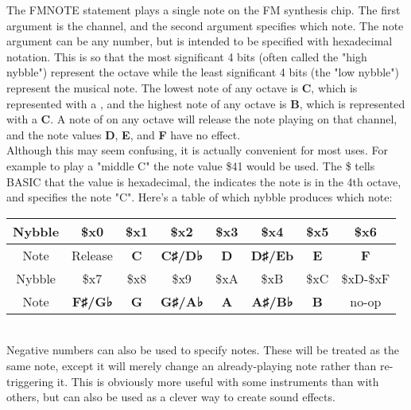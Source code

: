 The {\ttfamily FMNOTE} statement plays a single note on the FM synthesis chip.
The first argument is the channel, and the second argument specifies which
note.  The note argument can be any number, but is intended to be specified
with hexadecimal notation.  This is so that the most significant 4 bits (often
called the "high nybble") represent the octave while the least significant 4
bits (the "low nybble") represent the musical note.  The lowest note of any
octave is {\ttfamily\bfseries C}, which is represented with a {},
and the highest note of any octave is {\ttfamily\bfseries B}, which is
represented with a {\ttfamily\bfseries C}.  A note of {} on any
octave will release the note playing on that channel, and the note values
{\ttfamily\bfseries D}, {\ttfamily\bfseries E}, and {\ttfamily\bfseries F} have
no effect.\\

Although this may seem confusing, it is actually convenient for most uses.
For example to play a "middle C" the note value {\ttfamily \$41} would be used.
The {\ttfamily \$} tells BASIC that the value is hexadecimal, the {}
indicates the note is in the 4th octave, and {} specifies the note
"C".  Here's a table of which nybble produces which note:\\

\begin{tabular}{|c|c|c|c|c|c|c|c|}
	\hline

	Nybble & \$x0 & \$x1 & \$x2 & \$x3 & \$x4 & \$x5 & \$x6 \\ \hline Note &
	Release & {\ttfamily\bfseries C} & {\ttfamily\bfseries C♯/D♭} &
	{\ttfamily\bfseries D} & {\ttfamily\bfseries D♯/Eb} & {\ttfamily\bfseries
	E} & {\ttfamily\bfseries F} \\ \hline

	Nybble & \$x7 & \$x8 & \$x9 & \$xA & \$xB & \$xC & \$xD-\$xF \\ \hline Note
	& {\ttfamily\bfseries F♯/G♭} & {\ttfamily\bfseries G} & {\ttfamily\bfseries
	G♯/A♭} & {\ttfamily\bfseries A} & {\ttfamily\bfseries A♯/B♭} &
	{\ttfamily\bfseries B} & no-op \\ \hline

\end{tabular}\\

Negative numbers can also be used to specify notes.  These will be treated as
the same note, except it will merely change an already-playing note rather than
re-triggering it.  This is obviously more useful with some instruments than
with others, but can also be used as a clever way to create sound effects.\\

